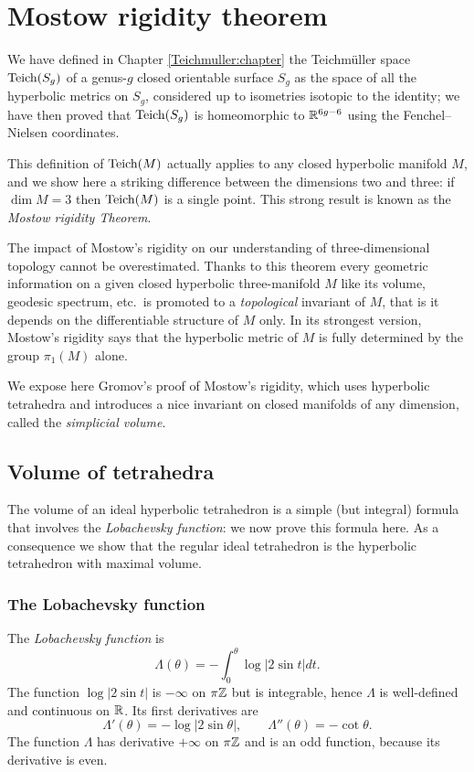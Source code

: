
\chapter{Mostow rigidity theorem} \label{Mostow:chapter}
We have defined in Chapter \ref{Teichmuller:chapter} the
Teichm\"uller space ${\rm Teich}(S_g)$ of a genus-$g$ closed orientable surface $S_g$ as the space of all the hyperbolic metrics on $S_g$, considered up to isometries isotopic to the identity; we have then proved that ${\rm Teich}(S_g)$ is homeomorphic to $\mathbb{R}^{6g-6}$ using the Fenchel--Nielsen coordinates.

This definition of ${\rm Teich}(M)$ actually applies to any closed hyperbolic manifold $M$, and we show here a striking difference between the dimensions two and three: if $\dim M = 3$ then ${\rm Teich}(M)$ is a single point. This strong result is known as the \emph{Mostow rigidity Theorem}. 

The impact of Mostow's rigidity on our understanding of three-dimensional topology cannot be overestimated. Thanks to this theorem every geometric information on a given closed hyperbolic three-manifold $M$ like its volume, geodesic spectrum, etc.~is promoted to a \emph{topological} invariant of $M$, that is it depends on the differentiable structure of $M$ only. In its strongest version, Mostow's rigidity says that the hyperbolic metric of $M$ is fully determined by the group $\pi_1(M)$ alone. 

We expose here Gromov's proof of Mostow's rigidity, which uses hyperbolic tetrahedra and introduces a nice invariant on closed manifolds of any dimension, called the \emph{simplicial volume}.

\section{Volume of tetrahedra} \label{volume:tetrahedra:section}
The volume of an ideal hyperbolic tetrahedron is a simple (but integral) formula that involves the \emph{Lobachevsky function}: we now prove this formula here. As a consequence we show that the regular ideal tetrahedron is the hyperbolic tetrahedron with maximal volume.

\subsection{The Lobachevsky function}
The \emph{Lobachevsky function} is
$$\Lambda(\theta) = -\int_0^\theta \log |2\sin t| dt.$$
The function $\log |2\sin t|$ is $-\infty$ on $\pi\mathbb{Z}$ but is integrable, hence $\Lambda$ is well-defined and continuous on $\mathbb{R}$. Its first derivatives are
$$\Lambda'(\theta) = -\log |2\sin \theta |, \qquad \Lambda''(\theta) = -\cot \theta.$$
The function $\Lambda$ has derivative $+\infty$ on $\pi\mathbb{Z}$ and is an odd function, because its derivative is even. 


